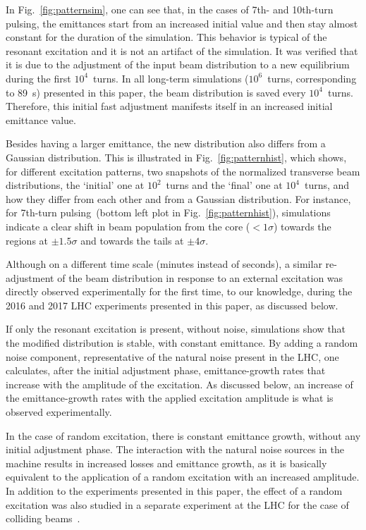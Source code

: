 \documentclass[
prstab
,reprint
,linenumbers
,longbibliography
,preprintnumbers
,showkeys
,amsfonts,amssymb,amsmath
,floatfix
]{revtex4-1}
\newcommand{\seventhtp}{7th-turn pulsing}
\newcommand{\tenthtp}{10th-turn pulsing}
\begin{document}
In Fig.~\ref{fig:patternsim}, one can see that, in the cases of 7th-
and \tenthtp, the emittances start from an increased initial value and
then stay almost constant for the duration of the simulation. This
behavior is typical of the resonant excitation and it is not an
artifact of the simulation. It was verified that it is due to the
adjustment of the input beam distribution to a new equilibrium during
the first $10^4$~turns. In all long-term simulations ($10^6$~turns,
corresponding to 89~s) presented in this paper, the beam distribution
is saved every $10^4$~turns. Therefore, this initial fast adjustment
manifests itself in an increased initial emittance value.

Besides having a larger emittance, the new distribution also differs
from a Gaussian distribution.  This is illustrated in
Fig.~\ref{fig:patternhist}, which shows, for different excitation
patterns, two snapshots of the normalized transverse beam
distributions, the `initial' one at $10^2$~turns and the `final' one
at $10^4$~turns, and how they differ from each other and from a
Gaussian distribution. For instance, for \seventhtp\ (bottom left plot
in Fig.~\ref{fig:patternhist}), simulations indicate a clear shift in
beam population from the core ($< 1\sigma$) towards the regions at
$\pm 1.5\sigma$ and towards the tails at $\pm 4\sigma$.

Although on a different time scale (minutes instead of seconds), a
similar re-adjustment of the beam distribution in response to an
external excitation was directly observed experimentally for the first
time, to our knowledge, during the 2016 and 2017 LHC experiments
presented in this paper, as discussed below.

If only the resonant excitation is present, without noise, simulations
show that the modified distribution is stable, with constant
emittance. By adding a random noise component, representative of the
natural noise present in the LHC, one calculates, after the initial
adjustment phase, emittance-growth rates that increase with the
amplitude of the excitation. As discussed below, an increase of the
emittance-growth rates with the applied excitation amplitude is what
is observed experimentally.

In the case of random excitation, there is constant emittance growth,
without any initial adjustment phase. The interaction with the natural
noise sources in the machine results in increased losses and emittance
growth, as it is basically equivalent to the application of a random
excitation with an increased amplitude. In addition to the experiments
presented in this paper, the effect of a random excitation was also
studied in a separate experiment at the LHC for the case of colliding
beams~\cite{md1433_noise_top_energy, md_noise_bbLHC}.
\end{document}
